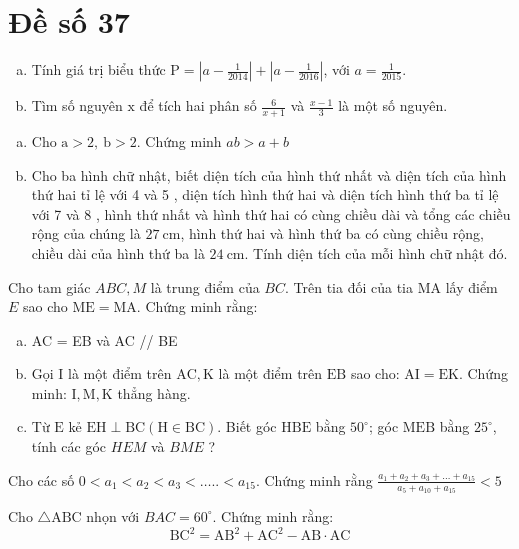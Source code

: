 \onehalfspacing
\section{Đề số 37}

\begin{bt} 
	\hfill
	\begin{enumerate}[a.]
		\item Tính giá trị biểu thức $\mathrm{P}=\left|a-\frac{1}{2014}\right|+\left|a-\frac{1}{2016}\right|$, với $a=\frac{1}{2015}$.
		\item Tìm số nguyên $\mathrm{x}$ để tích hai phân số $\frac{6}{x+1}$ và $\frac{x-1}{3}$ là một số nguyên.
	\end{enumerate}
	\loigiai{} 
\end{bt}

\begin{bt}
	\hfill
	\begin{enumerate}[a.]
		\item Cho $\mathrm{a}>2, \mathrm{~b}>2$. Chứng minh $a b>a+b$
		\item Cho ba hình chữ nhật, biết diện tích của hình thứ nhất và diện tích của hình thứ hai tỉ lệ với 4 và 5 , diện tích hình thứ hai và diện tích hình thứ ba tỉ lệ với 7 và 8 , hình thứ nhất và hình thứ hai có cùng chiều dài và tổng các chiều rộng của chúng là $27 \mathrm{~cm}$, hình thứ hai và hình thứ ba có cùng chiều rộng, chiều dài của hình thứ ba là $24 \mathrm{~cm}$. Tính diện tích của mỗi hình chữ nhật đó.
	\end{enumerate}
	\loigiai{} 
\end{bt}

\begin{bt}
	Cho tam giác $A B C, M$ là trung điểm của $B C$. Trên tia đối của tia MA lấy điểm $E$ sao cho $\mathrm{ME}=\mathrm{MA}$. Chứng minh rằng:
	\begin{enumerate}[a.]
		\item AC = EB và AC // BE
		\item Gọi I là một điểm trên $\mathrm{AC}, \mathrm{K}$ là một điểm trên $\mathrm{EB}$ sao cho: $\mathrm{AI}=\mathrm{EK}$. Chứng minh: $\mathrm{I}, \mathrm{M}, \mathrm{K}$ thẳng hàng.
		\item Từ $\mathrm{E}$ kẻ $\mathrm{EH} \perp \mathrm{BC}(\mathrm{H} \in \mathrm{BC})$. Biết góc $\mathrm{HBE}$ bằng $50^{\circ}$; góc $\mathrm{MEB}$ bằng $25^{\circ}$, tính các góc $H E M$ và $B M E$ ?
	\end{enumerate}
	\loigiai{}
\end{bt}

\begin{bt}
	Cho các số $0<a_1<a_2<a_3<\ldots . .<a_{15}$. Chứng minh rằng $\frac{a_1+a_2+a_3+\ldots+a_{15}}{a_5+a_{10}+a_{15}}<5$
	\loigiai{}
\end{bt}

\begin{bt}
	Cho $\triangle \mathrm{ABC}$ nhọn với $B A C=60^{\circ}$. Chứng minh rằng:
	$$
	\mathrm{BC}^2=\mathrm{AB}^2+\mathrm{AC}^2-\mathrm{AB} \cdot \mathrm{AC}
	$$
	\loigiai{} 
\end{bt}
